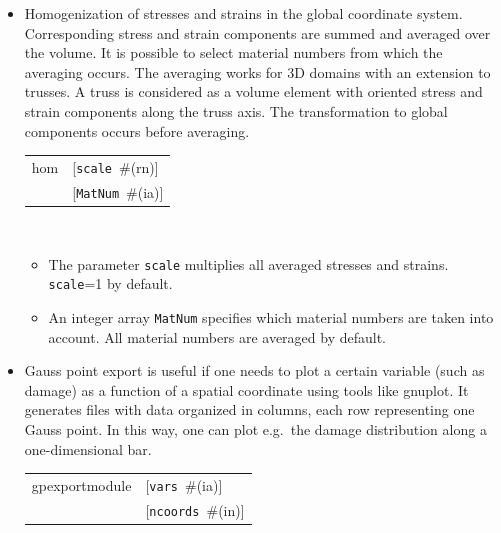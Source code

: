 \documentclass[a4paper]{article}
\makeatletter
\newcommand{\param}[1]{\texttt{#1}} %
\newcommand{\optional}[1]{[#1]} %
\newcommand{\field}[2]{\param{#1}~\#{\tiny(#2)}} %
\newcommand{\optField}[2]{\optional{\field{#1}{#2}}}
\newenvironment{record}[1][]{\begin{tabular}{|ll}}{\end{tabular}\\}
\newcommand{\recentry}[2]{{#1}&{#2}\\}
\newcounter{rcc}
\newenvironment{record}[1][\textwidth]{\setcounter{rcc}{0}\begin{tabular*}{#1}{|ll@{\extracolsep{\fill}}r}}{\end{tabular*}\\}
\newcommand{\recentry}[2]{\ifthenelse{\value{rcc}>0}{&$\backslash$ \\}{\setcounter{rcc}{1}}{#1}&{#2}}
\makeatother
\begin{document}
\begin{itemize}
\item Homogenization of stresses and strains in the global coordinate system. Corresponding stress and strain components are summed and averaged over the volume. It is possible to select material numbers from which the averaging occurs. The averaging works for 3D domains with an extension to trusses. A truss is considered as a volume element with oriented stress and strain components along the truss axis. The transformation to global components occurs before averaging.

\begin{record}[0.9\textwidth]
  \recentry{hom}{\optField{scale}{rn}}
  \recentry{}{\optField{MatNum}{ia}}
\end{record}
\begin{itemize}

\item The parameter \param{scale} multiplies all averaged stresses and strains. \param{scale}=1 by default.

\item An integer array \param{MatNum} specifies which material numbers are taken into account. All material numbers are averaged by default.
\end{itemize}

\item Gauss point export is useful if one needs to plot a certain variable
(such as damage) as a function of a spatial coordinate using tools like
gnuplot. It generates files with data organized in columns, each row
representing one Gauss point. In this way, one can plot e.g.\ the damage
distribution along a one-dimensional bar.

\begin{record}[0.9\textwidth]
  \recentry{gpexportmodule}{\optField{vars}{ia}}
  \recentry{}{\optField{ncoords}{in}}
\end{record}


\end{itemize}
\end{document}
